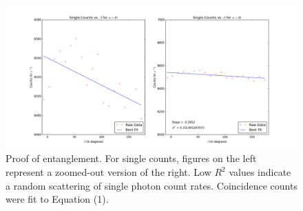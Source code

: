 \documentclass[10pt,a4paper]{article}
\begin{document}
\begin{figure}[H]
\includegraphics[scale=0.42]{../Analysis/alpha=45single.png}
\caption{Proof of entanglement. For single counts, figures on the left represent a zoomed-out version of the right. Low $R^{2}$ values indicate a random scattering of single photon count rates. Coincidence counts were fit to Equation (1).}
\end{figure}
\end{document}
